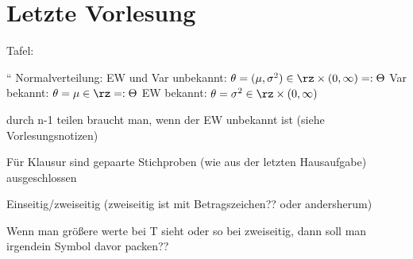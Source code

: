

\chapter{Letzte Vorlesung}

Tafel:

``
Normalverteilung:
EW und Var unbekannt: $\theta = (\mu, \sigma^2) \in \rz \times (0, \infty) = : \Theta $
Var bekannt: $\theta = \mu \in \rz = : \Theta $
EW bekannt: $\theta = \sigma^2 \in \rz \times (0, \infty)$


durch n-1 teilen braucht man, wenn der EW unbekannt ist (siehe Vorlesungsnotizen)


Für Klausur sind gepaarte Stichproben (wie aus der letzten Hausaufgabe) ausgeschlossen

Einseitig/zweiseitig (zweiseitig ist mit Betragszeichen?? oder andersherum)

Wenn man größere werte bei T sieht oder so bei zweiseitig, dann soll man irgendein Symbol davor packen??